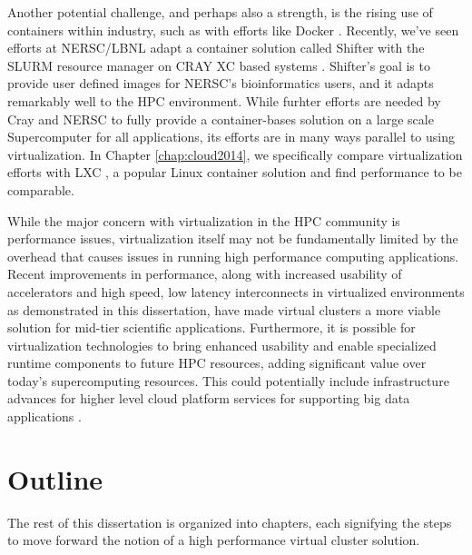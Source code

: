 Another potential challenge, and perhaps also a strength, is the rising use of containers within industry, such as with efforts like Docker \cite{merkel2014docker}. Recently, we've seen efforts at NERSC/LBNL adapt a container solution called Shifter with the SLURM resource manager on CRAY XC based systems \cite{jacobsen2015contain}. Shifter's goal is to provide user defined images for NERSC's bioinformatics users, and it adapts remarkably well to the HPC environment. While furhter efforts are needed by Cray and NERSC to fully provide a container-bases solution on a large scale Supercomputer for all applications, its efforts are in many ways parallel to using virtualization. In Chapter \ref{chap:cloud2014}, we specifically compare virtualization efforts with LXC \cite{xavier2013performance}, a popular Linux container solution and find performance to be comparable.  

 


While the major concern with virtualization in the HPC community is performance issues, virtualization itself may not be fundamentally limited by the overhead that causes issues in running high performance computing applications. Recent improvements in performance, along with increased usability of accelerators and high speed, low latency interconnects in virtualized environments as demonstrated in this dissertation, have made virtual clusters a more viable solution for mid-tier scientific applications.  Furthermore, it is possible for  virtualization technologies to bring enhanced usability and enable specialized runtime components to future HPC resources, adding significant value over today's supercomputing resources.  This could potentially include infrastructure advances for higher level cloud platform services for supporting big data applications \cite{qiu2014towards}. 







\section{Outline}
\label{sec:outline}


The rest of this dissertation is organized into chapters, each signifying the steps to move forward the notion of a high performance virtual cluster solution.

